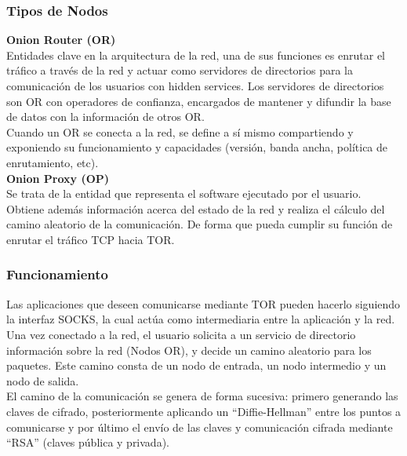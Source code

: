 \subsubsection {Tipos de Nodos}

\textbf {Onion Router (OR)} \\
Entidades clave en la arquitectura de la red, una de sus funciones es enrutar el tráfico a través de la red y actuar como servidores de directorios para la comunicación de los usuarios con hidden services. Los servidores de directorios son OR con operadores de confianza, encargados de mantener y difundir la base de datos con la información de otros OR. \\

Cuando un OR se conecta a la red, se define a sí mismo compartiendo y exponiendo su funcionamiento y capacidades (versión, banda ancha, política de enrutamiento, etc). \\

\textbf {Onion Proxy (OP)} \\
Se trata de la entidad que representa el software ejecutado por el usuario. Obtiene además información acerca del estado de la red y realiza el cálculo del camino aleatorio de la comunicación. De forma que pueda cumplir su función de enrutar el tráfico TCP hacia TOR.

\subsubsection {Funcionamiento}

Las aplicaciones que deseen comunicarse mediante TOR pueden hacerlo siguiendo la interfaz SOCKS, la cual actúa como intermediaria entre la aplicación y la red. \\

Una vez conectado a la red, el usuario solicita a un servicio de directorio información sobre la red (Nodos OR), y decide un camino aleatorio para los paquetes. Este camino consta de un nodo de entrada, un nodo intermedio y un nodo de salida. \\

El camino de la comunicación se genera de forma sucesiva: primero generando las claves de cifrado, posteriormente aplicando un \hyphenquote{spanish}{Diffie-Hellman} entre los puntos a comunicarse y por último el envío de las claves y comunicación cifrada mediante \hyphenquote{spanish}{RSA} (claves pública y privada). \\


